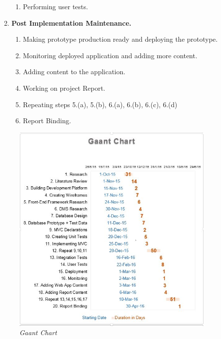 \documentclass[12pt,twoside,a4paper]{report}
\begin{document}
\begin{enumerate}
\begin{enumerate}
	\item Performing user tests.
	\end{enumerate}
\item \textbf{Post Implementation Maintenance.}
	\begin{enumerate}\itemsep1pt \parskip0pt 
	\item Making prototype production ready and deploying the prototype.
	\item Monitoring deployed application and adding more content.
	\item Adding content to the application.
	\item Working on project Report.
	\item Repeating steps 5.(a), 5.(b), 6.(a), 6.(b), 6.(c), 6.(d)
	\item Report Binding.
	\end{enumerate}
\end{enumerate}
\begin{figure}[!ht]
	\centering
		\includegraphics[width=0.9\textwidth,totalheight=9cm]{gaant}
	\caption{\textit{Gaant Chart}}
	\label{f1.2}
\end{figure}

\end{document}
